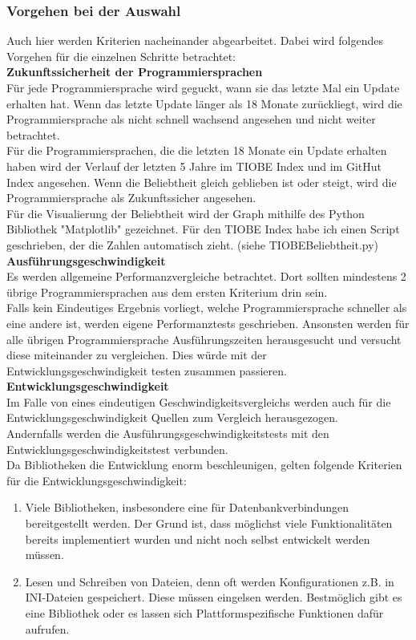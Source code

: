 \documentclass[ngerman]{article}
\begin{document}
    \subsubsection{Vorgehen bei der Auswahl}
    Auch hier werden Kriterien nacheinander abgearbeitet. Dabei wird folgendes Vorgehen für die einzelnen Schritte betrachtet:\\
    \textbf{Zukunftssicherheit der Programmiersprachen}\\
    Für jede Programmiersprache wird geguckt, wann sie das letzte Mal ein Update erhalten hat. Wenn das letzte Update länger als 18 Monate zurückliegt, wird die Programmiersprache als nicht schnell wachsend angesehen und nicht weiter betrachtet.\\
    Für die Programmiersprachen, die die letzten 18 Monate ein Update erhalten haben wird der Verlauf der letzten 5 Jahre im TIOBE Index und im GitHut Index angesehen. Wenn die Beliebtheit gleich geblieben ist oder steigt, wird die Programmiersprache als Zukunftssicher angesehen.\\
    Für die Visualierung der Beliebtheit wird der Graph mithilfe des Python Bibliothek "Matplotlib" gezeichnet. Für den TIOBE Index habe ich einen Script geschrieben, der die Zahlen automatisch zieht. (siehe TIOBEBeliebtheit.py)\\
    \textbf{Ausführungsgeschwindigkeit}\\
    Es werden allgemeine Performanzvergleiche betrachtet. Dort sollten mindestens 2 übrige Programmiersprachen aus dem ersten Kriterium drin sein.\\
    Falls kein Eindeutiges Ergebnis vorliegt, welche Programmiersprache schneller als eine andere ist, werden eigene Performanztests geschrieben. Ansonsten werden für alle übrigen Programmiersprache Ausführungszeiten herausgesucht und versucht diese miteinander zu vergleichen. Dies würde mit der Entwicklungsgeschwindigkeit testen zusammen passieren.\\
    \textbf{Entwicklungsgeschwindigkeit}\\
    Im Falle von eines eindeutigen Geschwindigkeitsvergleichs werden auch für die Entwicklungsgeschwindigkeit Quellen zum Vergleich herausgezogen.\\
    Andernfalls werden die Ausführungsgeschwindigkeitstests mit den Entwicklungsgeschwindigkeitstest verbunden.\\
    Da Bibliotheken die Entwicklung enorm beschleunigen, gelten folgende Kriterien für die Entwicklungsgeschwindigkeit:
    \begin{enumerate}
        \item Viele Bibliotheken, insbesondere eine für Datenbankverbindungen bereitgestellt werden. Der Grund ist, dass möglichst viele Funktionalitäten bereits implementiert wurden und nicht noch selbst entwickelt werden müssen.
        \item Lesen und Schreiben von Dateien, denn oft werden Konfigurationen z.B. in INI-Dateien gespeichert. Diese müssen eingelsen werden. Bestmöglich gibt es eine Bibliothek oder es lassen sich Plattformspezifische Funktionen dafür aufrufen.
    \end{enumerate}
\end{document}
